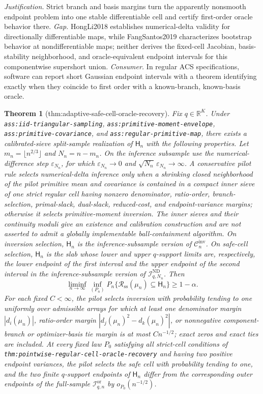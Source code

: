 \documentclass{article}
\newtheorem{theorem}{Theorem}
\begin{document}
\par\smallskip\noindent \textit{Justification.} Strict branch and basis margins turn the apparently nonsmooth endpoint problem into one stable differentiable cell and certify first-order oracle behavior there. \textit{Gap.} HongLi2018 establishes numerical-delta validity for directionally differentiable maps, while FangSantos2019 characterizes bootstrap behavior at nondifferentiable maps; neither derives the fixed-cell Jacobian, basis-stability neighborhood, and oracle-equivalent endpoint intervals for this componentwise supershort union. \textit{Consumer.} In regular ACS specifications, software can report short Gaussian endpoint intervals with a theorem identifying exactly when they coincide to first order with a known-branch, known-basis oracle.

\begin{theorem}[thm:adaptive-safe-cell-oracle-recovery]\label{thm:adaptive-safe-cell-oracle-recovery}
Fix \(q\in\mathbb R^K\).  Under \texttt{ass:iid-triangular-sampling}, \texttt{ass:primitive-moment-envelope}, \texttt{ass:primitive-covariance}, and \texttt{ass:regular-primitive-map}, there exists a calibrated-sieve split-sample realization of \(\mathsf H_n\) with the following properties.  Let \(m_n=\lfloor n^{2/3}\rfloor\) and \(N_n=n-m_n\).  On the inference subsample use the numerical-difference step \(\varepsilon_{N_n}\), for which \(\varepsilon_{N_n}\to0\) and \(\sqrt{N_n}\,\varepsilon_{N_n}\to\infty\).  A conservative pilot rule selects numerical-delta inference only when a shrinking closed neighborhood of the pilot primitive mean and covariance is contained in a compact inner sieve of one strict regular cell having nonzero denominator, ratio-order, branch-selection, primal-slack, dual-slack, reduced-cost, and endpoint-variance margins; otherwise it selects primitive-moment inversion.  The inner sieves and their continuity moduli give an existence and calibration construction and are not asserted to admit a globally implementable ball-containment algorithm.  On inversion selection, \(\mathsf H_n\) is the inference-subsample version of \(\mathcal C_n^{\mathrm{inv}}\).  On safe-cell selection, \(\mathsf H_n\) is the slab whose lower and upper \(q\)-support limits are, respectively, the lower endpoint of the first interval and the upper endpoint of the second interval in the inference-subsample version of \(\mathcal I_{q,N_n}^{\mathrm{ND}}\).  Then
\[
 \liminf_{n\to\infty}\inf_{(P_n)}P_n\{\mathcal R_{\mathrm{ss}}(\mu_n)\subseteq\mathsf H_n\}\ge1-\alpha.
\]
For each fixed \(C<\infty\), the pilot selects inversion with probability tending to one uniformly over admissible arrays for which at least one denominator margin \(|d_i(\mu_n)|\), ratio-order margin \(|d_j(\mu_n)^2-d_k(\mu_n)^2|\), or nonnegative component-branch or optimizer-basis tie margin is at most \(Cn^{-1/2}\); exact zeros and exact ties are included.  At every fixed law \(P_0\) satisfying all strict-cell conditions of \texttt{thm:pointwise-regular-cell-oracle-recovery} and having two positive endpoint variances, the pilot selects the safe cell with probability tending to one, and the two finite \(q\)-support endpoints of \(\mathsf H_n\) differ from the corresponding outer endpoints of the full-sample \(\mathcal I_{q,n}^{\mathrm{or}}\) by \(o_{P_0}(n^{-1/2})\).

\end{theorem}
\end{document}
